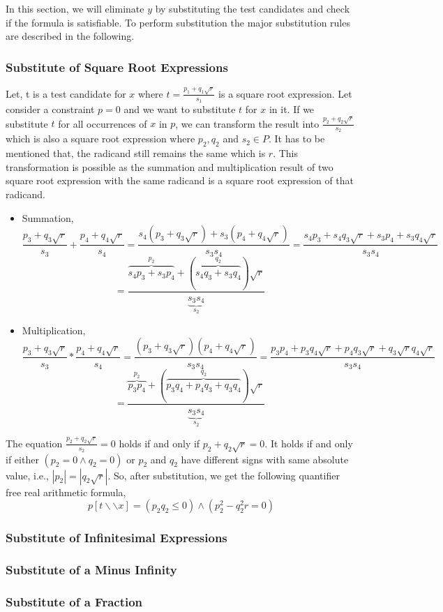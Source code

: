 In this section, we will eliminate $y$ by substituting the test candidates and check if the formula is satisfiable. To perform substitution the major substitution rules are described in the following.
\subsubsection{Substitute of Square Root Expressions}
Let, t is a test candidate for $x$ where $t = \frac{p_{1}+q_{1}\sqrt{r}}{s_{1}}$ is a square root expression. Let consider a constraint $p=0$ and we want to substitute $t$ for $x$ in it. If we substitute $t$ for all occurrences of $x$ in $p$, we can transform the result into $\frac{p_{2}+q_{2}\sqrt{r}}{s_{2}}$ which is also a square root expression where $p_{2}, q_{2}$ and $s_{2}\in P$. It has to be mentioned that, the radicand still remains the same which is $r$.
This transformation is possible as the summation and multiplication result of two square root expression with the same radicand is a square root expression of that radicand.
\begin{itemize}
	\item Summation,
	$$ \frac{p_{3}+q_{3}\sqrt{r}}{s_{3}}+\frac{p_{4}+q_{4}\sqrt{r}}{s_{4}} = \frac{s_{4}(p_{3}+q_{3}\sqrt{r})+s_{3}(p_{4}+q_{4}\sqrt{r})}{s_{3}s_{4}} = \frac{s_{4}p_{3}+s_{4}q_{3}\sqrt{r}+s_{3}p_{4}+s_{3}q_{4}\sqrt{r}}{s_{3}s_{4}}$$
	$$ =\frac{\overbrace{s_{4}p_{3}+s_{3}p_{4}}\limits^{p_{2}}+(\overbrace{s_{4}q_{3}+s_{3}q_{4}}\limits^{q_{2}})\sqrt{r}}{\underbrace{s_{3}s_{4}}\limits_{s_{2}}}$$
	\item Multiplication,
	$$ \frac{p_{3}+q_{3}\sqrt{r}}{s_{3}}*\frac{p_{4}+q_{4}\sqrt{r}}{s_{4}} =
	\frac{(p_{3}+q_{3}\sqrt{r})(p_{4}+q_{4}\sqrt{r})}{s_{3}s_{4}} =
	\frac{p_{3}p_{4}+p_{3}q_{4}\sqrt{r}+p_{4}q_{3}\sqrt{r}+q_{3}\sqrt{r}q_{4}\sqrt{r}}{s_{3}s_{4}}$$
	$$
	=\frac{\overbrace{p_{3}p_{4}}\limits^{p_{2}}+(\overbrace{p_{3}q_{4}+p_{4}q_{3}+q_{3}q_{4}}\limits^{q_{2}})\sqrt{r}}{\underbrace{s_{3}s_{4}}\limits_{s_{2}}}$$
\end{itemize}

The equation $\frac{p_{2}+q_{2}\sqrt{r}}{s_{2}} = 0$ holds if and only if $p_{2}+q_{2}\sqrt{r} = 0$. It holds if and only if either $(p_{2} = 0\wedge q_{2} = 0)$ or $p_{2}$ and $q_{2}$ have different signs with same absolute value, i.e., $|p_{2}|=|q_{2}\sqrt{r}|$. So, after substitution, we get the following quantifier free real arithmetic formula,
$$ p[t\backslash\backslash x] = (p_{2}q_{2}\leq 0) \wedge (p_{2}^{2} - q_{2}^{2} r = 0) $$
\subsubsection{Substitute of Infinitesimal Expressions}
\subsubsection{Substitute of a Minus Infinity}
\subsubsection{Substitute of a Fraction}
